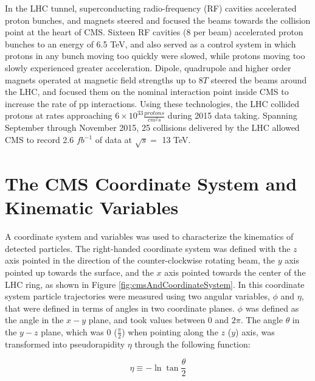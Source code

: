 In the LHC tunnel, superconducting radio-frequency (RF) cavities accelerated proton bunches, and magnets steered and 
focused the beams towards the collision point at the heart of CMS.  Sixteen RF cavities (8 per beam) accelerated proton 
bunches to an energy of 6.5 TeV, and also served as a control system in which protons in any bunch moving too quickly 
were slowed, while protons moving too slowly experienced greater acceleration.  Dipole, quadrupole and higher order 
magnets operated at magnetic field strengths up to 8$\unit{T}$ steered the beams around the LHC, and focused them 
on the nominal interaction point inside CMS to increase the rate of pp interactions.  Using these technologies, the  
LHC collided protons at rates approaching $6 \times 10^{33} \frac{protons}{cm^{2}s}$ during 2015 data taking.  
Spanning September through November 2015, 25 \ns collisions delivered by the LHC allowed CMS to record 2.6 $fb^{-1}$ 
of data at $\sqrt{s} =$ 13 TeV.

\section{The CMS Coordinate System and Kinematic Variables}
\label{sec:coordinateSystemAndKinematicVars}
A coordinate system and variables was used to characterize the kinematics of detected particles.  
The right-handed coordinate system was defined with the $z$ axis pointed in the direction 
of the counter-clockwise rotating beam, the $y$ axis pointed up towards the surface, and the $x$ axis pointed towards 
the center of the LHC ring, as shown in Figure \ref{fig:cmsAndCoordinateSystem}.  In this coordinate system particle 
trajectories were measured using two angular variables, $\phi$ and $\eta$, that were defined in terms of angles 
in two coordinate planes.  $\phi$ was defined as the angle in the $x-y$ plane, and took values between 0 and $2\pi$.  
The angle $\theta$ in the $y-z$ plane, which was 0 ($\frac{\pi}{2}$) when pointing along the $z$ ($y$) axis, was 
transformed into pseudorapidity $\eta$ through the following function:

\begin{equation}
	\eta \equiv -\ln{\tan{\frac{\theta}{2}}}
\end{equation}


